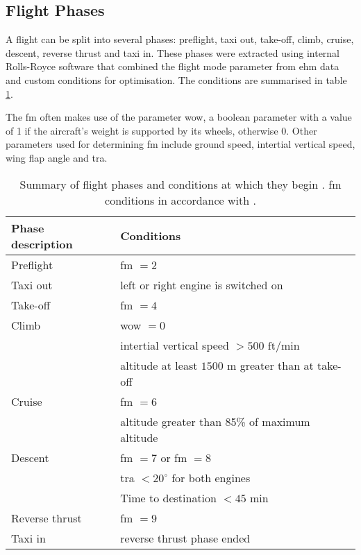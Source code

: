 
\subsection{Flight Phases} \label{sec:phases}
A flight can be split into several phases: preflight, taxi out, take-off, climb, cruise, descent, reverse thrust and taxi in. These phases were extracted using internal Rolls-Royce software \cite[]{konig_br725stats_2018} that combined the flight mode parameter from \ac{ehm} data \cite[]{reischl_br700-725a1-12_2014} and custom conditions for optimisation. The conditions are summarised in table \ref{tab:flight_phases}.

The \ac{fm} often makes use of the parameter \ac{wow}, a boolean parameter with a value of 1 if the aircraft's weight is supported by its wheels, otherwise 0. Other parameters used for determining \ac{fm} include ground speed, intertial vertical speed, wing flap angle and \ac{tra}.

\begin{table}
    \begin{center}
        \caption{\label{tab:flight_phases} Summary of flight phases and conditions at which they begin \cite[]{konig_br725stats_2018}. \ac{fm} conditions in accordance with \citet{reischl_br700-725a1-12_2014}.}
        \begin{tabular}{ l l }
            Phase description & Conditions \\
            \midrule
            Preflight & \ac{fm} \(= 2\) \\
            Taxi out & left or right engine is switched on \\
            Take-off & \ac{fm} \(= 4\) \\
            Climb & \ac{wow} \(= 0\) \\
            & intertial vertical speed \(> 500\) \(\text{ft} / \text{min}\) \\
            & altitude at least \(1500 \) m greater than at take-off \\
            Cruise & \ac{fm} \(= 6\) \\
            & altitude greater than 85\% of maximum altitude \\
            Descent & \ac{fm} \(= 7\) or \ac{fm} \(= 8\) \\
            & \ac{tra} \(< 20^{\circ} \) for both engines \\
            & Time to destination \(< 45\) \(\text{min}\) \\
            Reverse thrust & \ac{fm} \(= 9\) \\
            Taxi in & reverse thrust phase ended
        \end{tabular}
    \end{center}
\end{table}

